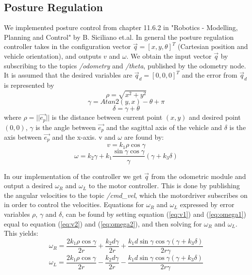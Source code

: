 \documentclass[a4paper,10pt]{article}
\begin{document}
		
\subsection{Posture Regulation}

	
		We implemented posture control from chapter 11.6.2 in  "Robotics - Modelling, Planning and Control" by B. Siciliano et.al. 
		In general the posture regulation controller takes in the configuration vector $\vec{q} = [x, y, \theta]^{T}$ (Cartesian position and vehicle orientation), 
		and outputs $v$ and $\omega$. We obtain the input vector $\vec{q}$ by subscribing to the topics \textit{/odometry} and \textit{/theta}, published by the odometry node.
		It is assumed that the desired variables are $\vec{q}_{d} = [0, 0, 0]^{T}$ and the error from $\vec{q}_{d}$ is represented by
		\begin{equation}
			\rho = \sqrt{x^{2} + y^{2}} 
		\end{equation}
		\begin{equation} \label{eq:gamma}
			\gamma = Atan2(y, x) - \theta + \pi
		\end{equation}
		\begin{equation}
			\delta = \gamma + \theta
		\end{equation}
		where $\rho = ||\vec{e_{p}}||$ is the distance between current point $(x, y)$ and desired point $(0, 0)$, 
		$\gamma$ is the angle between $\vec{e_{p}}$	and the sagittal axis of the vehicle and $\delta$ is the axis between $\vec{e_{p}}$ and the x-axis.	
		v and $\omega$ are found by:
		\begin{equation} \label{eq:v2}
			v = k_{1}\rho \cos{\gamma}
		\end{equation}		
		\begin{equation} \label{eq:omega2}
			\omega = k_{2}\gamma + k_{1}\frac{\sin{\gamma}\cos{\gamma}}{\gamma}(\gamma + k_{3}\delta)
		\end{equation}
		
		In our implementation of the controller we get $\vec{q}$ from the odometric module and output a desired $\omega_{R}$ and $\omega_{L}$ to the motor controller. 
		This is done by publishing the angular velocities to the topic \textit{/cmd\_vel}, which the motordriver subscribes on in order to control the velocities.
		Equations for $\omega_{R}$ and $\omega_{L}$ expressed by error variables $\rho$, $\gamma$ and $\delta$, can be found
		by setting equation (\ref{eq:v1}) and (\ref{eq:omega1}) equal to equation (\ref{eq:v2}) and (\ref{eq:omega2}), and then solving for $\omega_{R}$ and $\omega_{L}$. This yields:		
		\begin{equation}
			\omega_{R} = \frac{2k_{1}\rho \cos{\gamma}}{2r} + \frac{k_{2}d\gamma}{2r} + \frac{k_{1}d\sin{\gamma}\cos{\gamma}(\gamma + k_{3}\delta)}{2r\gamma}
		\end{equation}
		\begin{equation}
			\omega_{L} = \frac{2k_{1}\rho \cos{\gamma}}{2r} - \frac{k_{2}d\gamma}{2r} - \frac{k_{1}d\sin{\gamma}\cos{\gamma}(\gamma + k_{3}\delta)}{2r\gamma}
		\end{equation}
\end{document}
